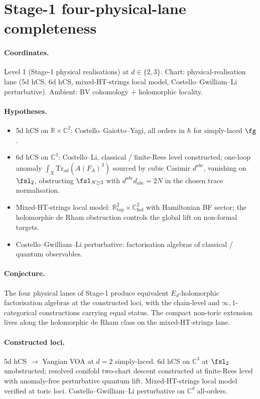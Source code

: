 \section{Stage-1 four-physical-lane completeness}
\label{sec:open-four-lanes}

\paragraph{Coordinates.} Level 1 (Stage-1 physical realisations) at
$d \in \{2, 3\}$. Chart: physical-realisation lane (5d hCS, 6d hCS,
mixed-HT-strings local model, Costello--Gwilliam--Li perturbative).
Ambient: BV cohomology + holomorphic locality.

\paragraph{Hypotheses.}
\begin{itemize}[nosep]
\item 5d hCS on $\mathbb{R} \times \mathbb{C}^2$:
  Costello--Gaiotto--Yagi, all orders in $\hbar$ for simply-laced $\fg$.
\item 6d hCS on $\mathbb{C}^3$: Costello--Li, classical / finite-Rees
  level constructed; one-loop anomaly $\int_X \mathrm{Tr}_{\mathrm{ad}}(A(F_A)^3)$
  sourced by cubic Casimir $d^{abc}$, vanishing on $\fsl_2$,
  obstructing $\fsl_{N \geq 3}$ with $d^{abc}d_{abc} = 2N$ in the chosen
  trace normalisation.
\item Mixed-HT-strings local model: $\mathbb{R}^2_{\mathrm{top}} \times \mathbb{C}^2_{\mathrm{hol}}$
  with Hamiltonian BF sector; the holomorphic de Rham obstruction
  controls the global lift on non-formal targets.
\item Costello--Gwilliam--Li perturbative: factorisation algebras of
  classical / quantum observables.
\end{itemize}

\paragraph{Conjecture.} The four physical lanes of
Stage-1 produce equivalent $E_d$-holomorphic factorisation algebras at
the constructed loci, with the chain-level and \(\infty,1\)-categorical constructions carrying equal status. The compact non-toric extension lives along the holomorphic de
Rham class on the mixed-HT-strings lane.

\paragraph{Constructed loci.} 5d hCS $\to$ Yangian VOA at $d = 2$
simply-laced. 6d hCS on $\mathbb{C}^3$ at $\fsl_2$ unobstructed; resolved
conifold two-chart descent constructed at finite-Rees level with
anomaly-free perturbative quantum lift. Mixed-HT-strings local model
verified at toric loci. Costello--Gwilliam--Li perturbative on
$\mathbb{C}^d$ all-orders.

